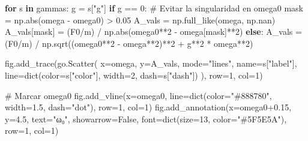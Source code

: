 \documentclass[
  letterpaper,
  DIV=11,
  numbers=noendperiod]{scrreprt}
\newenvironment{Shaded}{\begin{snugshade}}{\end{snugshade}}
\newcommand{\BuiltInTok}[1]{\textcolor[rgb]{0.00,0.23,0.31}{#1}}
\newcommand{\CommentTok}[1]{\textcolor[rgb]{0.37,0.37,0.37}{#1}}
\newcommand{\ControlFlowTok}[1]{\textcolor[rgb]{0.00,0.23,0.31}{\textbf{#1}}}
\newcommand{\DecValTok}[1]{\textcolor[rgb]{0.68,0.00,0.00}{#1}}
\newcommand{\FloatTok}[1]{\textcolor[rgb]{0.68,0.00,0.00}{#1}}
\newcommand{\KeywordTok}[1]{\textcolor[rgb]{0.00,0.23,0.31}{\textbf{#1}}}
\newcommand{\NormalTok}[1]{\textcolor[rgb]{0.00,0.23,0.31}{#1}}
\newcommand{\OperatorTok}[1]{\textcolor[rgb]{0.37,0.37,0.37}{#1}}
\newcommand{\StringTok}[1]{\textcolor[rgb]{0.13,0.47,0.30}{#1}}
\newcommand{\VariableTok}[1]{\textcolor[rgb]{0.07,0.07,0.07}{#1}}
\begin{document}
\begin{Shaded}
\begin{Highlighting}[]
\ControlFlowTok{for}\NormalTok{ s }\KeywordTok{in}\NormalTok{ gammas:}
\NormalTok{    g }\OperatorTok{=}\NormalTok{ s[}\StringTok{"g"}\NormalTok{]}
    \ControlFlowTok{if}\NormalTok{ g }\OperatorTok{==} \DecValTok{0}\NormalTok{:}
        \CommentTok{\# Evitar la singularidad en omega0}
\NormalTok{        mask }\OperatorTok{=}\NormalTok{ np.}\BuiltInTok{abs}\NormalTok{(omega }\OperatorTok{{-}}\NormalTok{ omega0) }\OperatorTok{\textgreater{}} \FloatTok{0.05}
\NormalTok{        A\_vals }\OperatorTok{=}\NormalTok{ np.full\_like(omega, np.nan)}
\NormalTok{        A\_vals[mask] }\OperatorTok{=}\NormalTok{ (F0}\OperatorTok{/}\NormalTok{m) }\OperatorTok{/}\NormalTok{ np.}\BuiltInTok{abs}\NormalTok{(omega0}\OperatorTok{**}\DecValTok{2} \OperatorTok{{-}}\NormalTok{ omega[mask]}\OperatorTok{**}\DecValTok{2}\NormalTok{)}
    \ControlFlowTok{else}\NormalTok{:}
\NormalTok{        A\_vals }\OperatorTok{=}\NormalTok{ (F0}\OperatorTok{/}\NormalTok{m) }\OperatorTok{/}\NormalTok{ np.sqrt((omega0}\OperatorTok{**}\DecValTok{2} \OperatorTok{{-}}\NormalTok{ omega}\OperatorTok{**}\DecValTok{2}\NormalTok{)}\OperatorTok{**}\DecValTok{2} \OperatorTok{+}\NormalTok{ g}\OperatorTok{**}\DecValTok{2} \OperatorTok{*}\NormalTok{ omega}\OperatorTok{**}\DecValTok{2}\NormalTok{)}

\NormalTok{    fig.add\_trace(go.Scatter(}
\NormalTok{        x}\OperatorTok{=}\NormalTok{omega, y}\OperatorTok{=}\NormalTok{A\_vals,}
\NormalTok{        mode}\OperatorTok{=}\StringTok{"lines"}\NormalTok{, name}\OperatorTok{=}\NormalTok{s[}\StringTok{"label"}\NormalTok{],}
\NormalTok{        line}\OperatorTok{=}\BuiltInTok{dict}\NormalTok{(color}\OperatorTok{=}\NormalTok{s[}\StringTok{"color"}\NormalTok{], width}\OperatorTok{=}\DecValTok{2}\NormalTok{, dash}\OperatorTok{=}\NormalTok{s[}\StringTok{"dash"}\NormalTok{])}
\NormalTok{    ), row}\OperatorTok{=}\DecValTok{1}\NormalTok{, col}\OperatorTok{=}\DecValTok{1}\NormalTok{)}

\CommentTok{\# Marcar omega0}
\NormalTok{fig.add\_vline(x}\OperatorTok{=}\NormalTok{omega0, line}\OperatorTok{=}\BuiltInTok{dict}\NormalTok{(color}\OperatorTok{=}\StringTok{"\#888780"}\NormalTok{, width}\OperatorTok{=}\FloatTok{1.5}\NormalTok{, dash}\OperatorTok{=}\StringTok{"dot"}\NormalTok{), row}\OperatorTok{=}\DecValTok{1}\NormalTok{, col}\OperatorTok{=}\DecValTok{1}\NormalTok{)}
\NormalTok{fig.add\_annotation(x}\OperatorTok{=}\NormalTok{omega0}\OperatorTok{+}\FloatTok{0.15}\NormalTok{, y}\OperatorTok{=}\FloatTok{4.5}\NormalTok{, text}\OperatorTok{=}\StringTok{"ω₀"}\NormalTok{, showarrow}\OperatorTok{=}\VariableTok{False}\NormalTok{,}
\NormalTok{    font}\OperatorTok{=}\BuiltInTok{dict}\NormalTok{(size}\OperatorTok{=}\DecValTok{13}\NormalTok{, color}\OperatorTok{=}\StringTok{"\#5F5E5A"}\NormalTok{), row}\OperatorTok{=}\DecValTok{1}\NormalTok{, col}\OperatorTok{=}\DecValTok{1}\NormalTok{)}


\end{Highlighting}
\end{Shaded}
\end{document}
